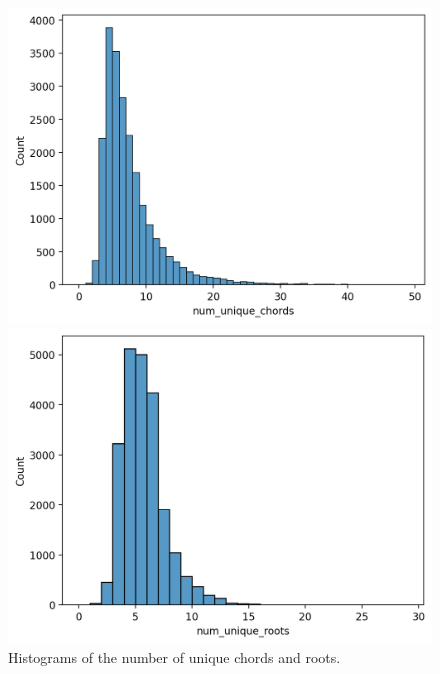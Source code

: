 \documentclass{article}
\begin{document}
\begin{figure}[!htbp]
    \centering
    \begin{minipage}{.49\textwidth}
        \centering
        \includegraphics[width=\linewidth]{images/num-unique-chords-histogram.png}
    \end{minipage}\hfill
    \begin{minipage}{.49\textwidth}
        \centering
        \includegraphics[width=\linewidth]{images/num-unique-roots-histogram.png}
    \end{minipage}
    \caption{Histograms of the number of unique chords and roots.}
    \label{fig:num-unique-chords-roots-histogram}
\end{figure}
\end{document}
